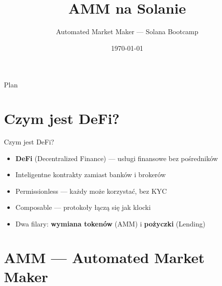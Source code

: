 

\usepackage[utf8]{inputenc}
\usepackage[T1]{fontenc}
\usepackage{amsmath}

\title{AMM na Solanie}
\subtitle{Automated Market Maker --- Solana Bootcamp}
\author{}
\date{\today}



\maketitleframe

\begin{frame}{Plan}
  \tableofcontents
\end{frame}

\section{Czym jest DeFi?}

\begin{frame}{Czym jest DeFi?}
  \begin{itemize}
    \item \textbf{DeFi} (Decentralized Finance) --- usługi finansowe bez pośredników
    \item Inteligentne kontrakty zamiast banków i brokerów
    \item Permissionless --- każdy może korzystać, bez KYC
    \item Composable --- protokoły łączą się jak klocki
    \item Dwa filary: \textbf{wymiana tokenów} (AMM) i \textbf{pożyczki} (Lending)
  \end{itemize}
\end{frame}

\section{AMM --- Automated Market Maker}

